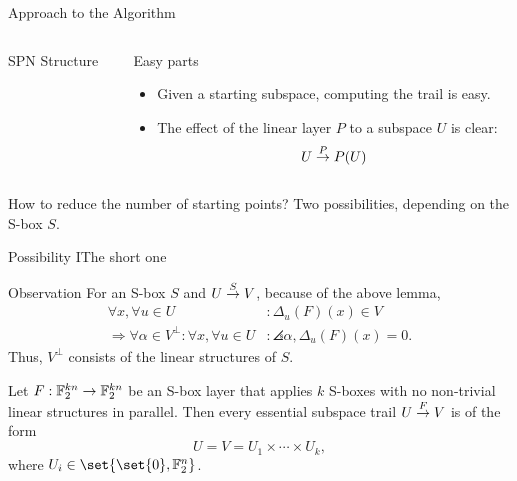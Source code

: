 \begin{frame}{Approach to the Algorithm}
\begin{columns}
\begin{column}{0.6\textwidth}
\begin{block}{SPN Structure\vphantom{y}}
                \vspace{0.5em}
            \end{block}
        \end{column}
        \begin{column}{0.35\textwidth}
            \begin{block}{Easy parts}
                \vspace{4mm}
                \begin{itemize}
                    \item Given a starting subspace, computing the trail is easy.
                    \item The effect of the linear layer $P$ to a subspace $U$ is clear:
                          \begin{equation*}
                              U \stackrel{P}{\rightarrow} P(U)
                          \end{equation*}
                \end{itemize}
                \vspace{4mm}
            \end{block}
        \end{column}
    \end{columns}
    \begin{block}{How to reduce the number of starting points?}
        Two possibilities, depending on the S-box $S$.
    \end{block}
\end{frame}

\begin{frame}{Possibility I}{The short one}
    \begin{block}{Observation}
        \vspace{0.25em}
        For an S-box $S$ and $U \stackrel{S}{\rightarrow} V$, because of the above lemma,
        \begin{align*}
            \forall x, \forall u \in U&: \Delta_u(F)(x) \in V \\
            \Rightarrow \forall \alpha \in V^\perp : \forall x, \forall u \in U &: \angles{\alpha, \Delta_u(F)(x)} = 0.
        \end{align*}
        Thus, $V^\perp$ consists of the linear structures of $S$.
    \end{block}
    \begin{theorem}
        Let $F : \mathbb{F}_2^{kn} \to \mathbb{F}_2^{kn}$ be an S-box layer that applies $k$ S-boxes with no non-trivial linear structures in parallel.
        Then every essential subspace trail $U \stackrel{F}{\rightarrow} V$ is of the form
        \begin{equation*}
            U = V = U_1 \times \cdots \times U_k,
        \end{equation*}
        where $U_i \in \set{\set{0}, \F_2^n}$.
    \end{theorem}
\end{frame}


